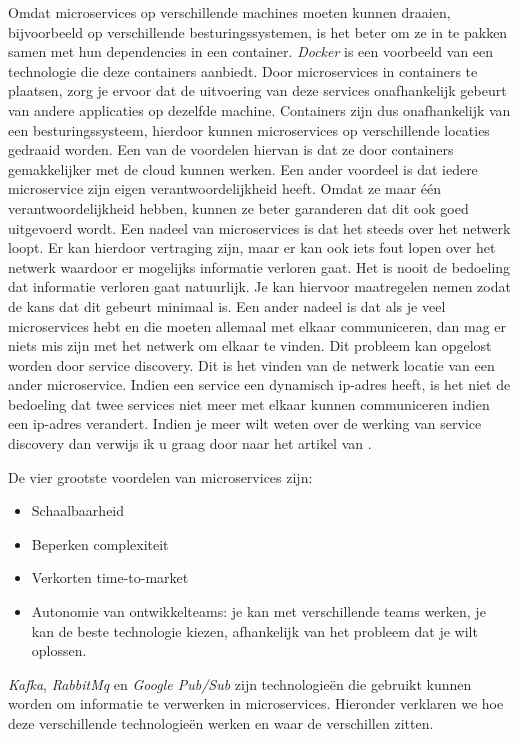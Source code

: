 Omdat microservices op verschillende machines moeten kunnen draaien, bijvoorbeeld op verschillende besturingssystemen, is het beter om ze in te pakken samen met hun dependencies in een container. \emph{Docker} is een voorbeeld van een technologie die deze containers aanbiedt. Door microservices in containers te plaatsen, zorg je ervoor dat de uitvoering van deze services onafhankelijk gebeurt van andere applicaties op dezelfde machine. Containers zijn dus onafhankelijk van een besturingssysteem, hierdoor kunnen microservices op verschillende locaties gedraaid worden. Een van de voordelen hiervan is dat ze door containers gemakkelijker met de cloud kunnen werken. Een ander voordeel is dat iedere microservice zijn eigen verantwoordelijkheid heeft. Omdat ze maar één verantwoordelijkheid hebben, kunnen ze beter garanderen dat dit ook goed uitgevoerd wordt. Een nadeel van microservices is dat het steeds over het netwerk loopt. Er kan hierdoor vertraging zijn, maar er kan ook iets fout lopen over het netwerk waardoor er mogelijks informatie verloren gaat. Het is nooit de bedoeling dat informatie verloren gaat natuurlijk. Je kan hiervoor maatregelen nemen zodat de kans dat dit gebeurt minimaal is. Een ander nadeel is dat als je veel microservices hebt en die moeten allemaal met elkaar communiceren, dan mag er niets mis zijn met het netwerk om elkaar te vinden. Dit probleem kan opgelost worden door service discovery. Dit is het vinden van de netwerk locatie van een ander microservice. Indien een service een dynamisch ip-adres heeft, is het niet de bedoeling dat twee services niet meer met elkaar kunnen communiceren indien een ip-adres verandert. Indien je meer wilt weten over de werking van service discovery dan verwijs ik u graag door naar het artikel van \textcite{Xu2019}.

De vier grootste voordelen van microservices zijn: 
\begin{itemize}
    \item Schaalbaarheid
    \item Beperken complexiteit
    \item Verkorten time-to-market
    \item Autonomie van ontwikkelteams: je kan met verschillende teams werken, je kan de beste technologie kiezen, afhankelijk van het probleem dat je wilt oplossen.
\end{itemize}

\emph{Kafka}, \emph{RabbitMq} en \emph{Google Pub/Sub} zijn technologieën die gebruikt kunnen worden om informatie te verwerken in microservices. Hieronder verklaren we hoe deze verschillende technologieën werken en waar de verschillen zitten.

